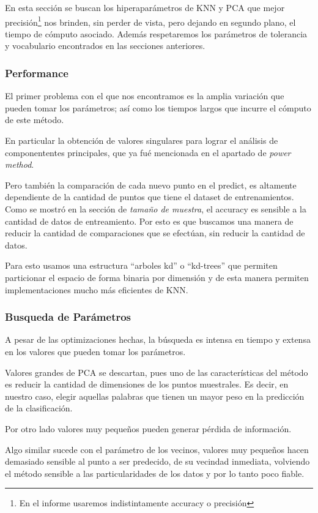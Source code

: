 En esta sección se buscan los hiperaparámetros de KNN y PCA que mejor
precisión\footnote{En el informe usaremos indistintamente accuracy o
  precisión} nos brinden, sin perder de vista, pero dejando en segundo
plano, el tiempo de cómputo asociado. Además respetaremos los
parámetros de tolerancia y vocabulario encontrados en las secciones
anteriores.

\subsubsection{Performance}

El primer problema con el que nos encontramos es la amplia variación
que pueden tomar los parámetros; así como los tiempos largos que
incurre el cómputo de este método.

En particular la obtención de valores singulares para lograr el
análisis de componententes principales, que ya fué mencionada en el
apartado de \emph{power method}.

Pero también la comparación de cada nuevo punto en el predict, es
altamente dependiente de la cantidad de puntos que tiene el dataset de
entrenamientos. Como se mostró en la sección de \emph{tamaño de
  muestra}, el accuracy es sensible a la cantidad de datos de
entreamiento. Por esto es que buscamos una manera de reducir la
cantidad de comparaciones que se efectúan, sin reducir la cantidad de
datos.

Para esto usamos una estructura ``arboles kd'' o ``kd-trees'' que
permiten particionar el espacio de forma binaria por dimensión y de
esta manera permiten implementaciones mucho más eficientes de KNN.

\subsubsection{Busqueda de Parámetros}

A pesar de las optimizaciones hechas, la búsqueda es intensa en tiempo
y extensa en los valores que pueden tomar los parámetros.

Valores grandes de PCA se descartan, pues uno de las características
del método es reducir la cantidad de dimensiones de los puntos
muestrales. Es decir, en nuestro caso, elegir aquellas palabras que
tienen un mayor peso en la predicción de la clasificación.

Por otro lado valores muy pequeños pueden generar pérdida de información.

Algo similar sucede con el parámetro de los vecinos, valores muy
pequeños hacen demasiado sensible al punto a ser predecido, de su
vecindad inmediata, volviendo el método sensible a las
particularidades de los datos y por lo tanto poco fiable.

